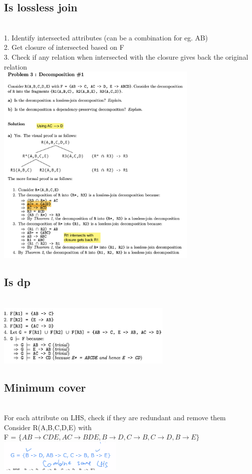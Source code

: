 \documentclass[11pt]{article}
\begin{document}
\begin{multicols*}{3}
\subsection*{Is lossless join}\\
1. Identify intersected attributes (can be a combination for eg. AB)\\
2. Get closure of intersected based on F\\
3. Check if any relation when intersected with the closure gives back the original relation
\\
\includegraphics[height=10cm]{images/b8}
\subsection*{Is dp}\\
\includegraphics[height=3cm]{images/b9}
\subsection*{Minimum cover}\\
For each attribute on LHS, check if they are redundant and remove them\\
Consider R(A,B,C,D,E) with \\F = $\{AB \rightarrow CDE, AC  \rightarrow BDE, B  \rightarrow D, C  \rightarrow B, C  \rightarrow D, B  \rightarrow E\}$\\
\includegraphics[height=1.5cm]{images/b11}

\end{multicols*}
\end{document}
